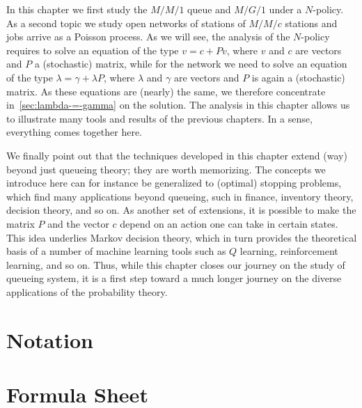 In this chapter we first study the $M/M/1$ queue and $M/G/1$ under a $N$-policy.
As a second topic we study open networks of stations of $M/M/c$ stations and jobs arrive as a Poisson process.
As we will see, the analysis of the $N$-policy requires to solve an equation of the type $v = c + P v$, where $v$ and $c$ are vectors and $P$ a (stochastic) matrix, while for the network we need to solve an equation of the type $\lambda = \gamma + \lambda P$, where $\lambda$ and $\gamma$ are vectors and $P$ is again a (stochastic) matrix.
As these equations are (nearly) the same, we therefore concentrate in~\cref{sec:lambda-=-gamma} on the solution.
The analysis in this chapter allows us to illustrate many tools and results of the previous chapters. In a sense, everything comes together here. 

We finally point out that the techniques developed in this chapter extend (way) beyond just queueing theory; they are worth memorizing.
The concepts we introduce here can for instance be generalized to (optimal) stopping problems, which find many applications beyond queueing, such in finance, inventory theory, decision theory, and so on.
As another set of extensions, it is possible to make the matrix $P$ and the vector $c$ depend on an action one can take in certain states.
This idea underlies Markov decision theory, which in turn provides the theoretical basis of a number of machine learning tools such as $Q$ learning, reinforcement learning, and so on.
Thus, while this chapter closes our journey on the study of queueing system, it is a first step toward a much longer journey on the diverse applications of the probability theory. 









%
%
%
%
%



\backmatter





\chapter{Notation}
\label{sec:notation}


\chapter{Formula Sheet}


\printindex

